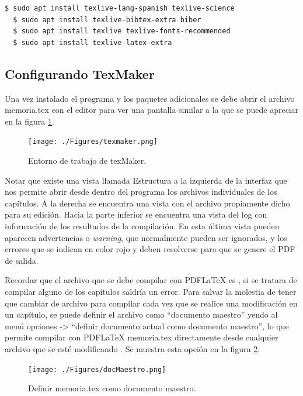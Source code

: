 \begin{lstlisting}[language=bash]
  $ sudo apt install texlive-lang-spanish texlive-science 
  $ sudo apt install texlive-bibtex-extra biber
  $ sudo apt install texlive texlive-fonts-recommended
  $ sudo apt install texlive-latex-extra
\end{lstlisting}


\subsection{Configurando TexMaker}


Una vez instalado el programa y los paquetes adicionales se debe abrir el archivo memoria.tex con el editor para ver una pantalla similar a la que se puede apreciar en la figura \ref{fig:texmaker}. 

\begin{figure}[h]
	\centering
	\texttt{[image: ./Figures/texmaker.png]}
	\caption{Entorno de trabajo de texMaker.}
	\label{fig:texmaker}
\end{figure}

Notar que existe una vista llamada Estructura a la izquierda de la interfaz que nos permite abrir desde dentro del programa los archivos individuales de los capítulos.  A la derecha se encuentra una vista con el archivo propiamente dicho para su edición. Hacia la parte inferior se encuentra una vista del log con información de los resultados de la compilación.  En esta última vista pueden aparecen advertencias o \textit{warning}, que normalmente pueden ser ignorados, y los errores que se indican en color rojo y deben resolverse para que se genere el PDF de salida.

Recordar que el archivo que se debe compilar con PDFLaTeX es , si se tratara de compilar alguno de los capítulos saldría un error.  Para salvar la molestia de tener que cambiar de archivo para compilar cada vez que se realice una modificación en un capítulo, se puede definir el archivo  como ``documento maestro'' yendo al menú opciones -> ``definir documento actual como documento maestro'', lo que permite compilar con PDFLaTeX memoria.tex directamente desde cualquier archivo que se esté modificando . Se muestra esta opción en la figura \ref{fig:docMaestro}.

\begin{figure}[h]
	\centering
	\texttt{[image: ./Figures/docMaestro.png]}
	\caption{Definir memoria.tex como documento maestro.}
	\label{fig:docMaestro}
\end{figure}

